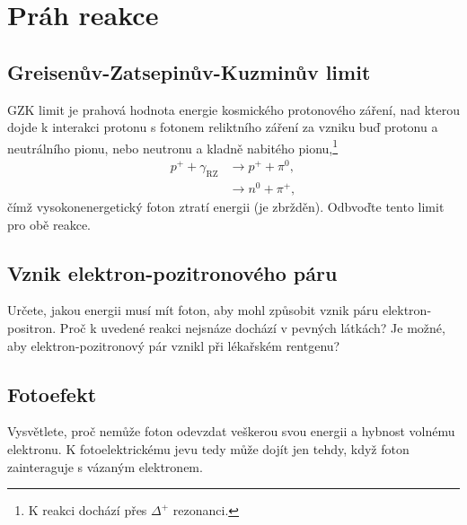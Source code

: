 \section{Práh reakce}
\subsection{Greisenův-Zatsepinův-Kuzminův limit}
    GZK limit je prahová hodnota energie kosmického protonového záření, nad kterou dojde k interakci protonu s fotonem reliktního záření za vzniku buď protonu a neutrálního pionu, nebo neutronu a kladně nabitého pionu,\footnote{
        K reakci dochází přes $\Delta^{+}$ rezonanci.
    }
    \begin{subequations}
        \begin{align}
            p^{+}+\gamma_{\mathrm{RZ}}
                &\longrightarrow p^{+}+\pi^{0},\\
                &\longrightarrow n^{0}+\pi^{+},
        \end{align}        
    \end{subequations}
    čímž vysokonenergetický foton ztratí energii (je zbržděn).
    Odbvoďte tento limit pro obě reakce.

\subsection{Vznik elektron-pozitronového páru}
    Určete, jakou energii musí mít foton, aby mohl způsobit vznik páru elektron-positron.
    Proč k uvedené reakci nejsnáze dochází v pevných látkách?
    Je možné, aby elektron-pozitronový pár vznikl při lékařském rentgenu?

\subsection{Fotoefekt}
    Vysvětlete, proč nemůže foton odevzdat veškerou svou energii a hybnost volnému elektronu.
    K fotoelektrickému jevu tedy může dojít jen tehdy, když foton zainteraguje s vázaným elektronem.